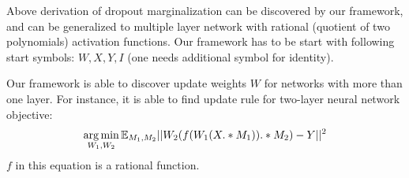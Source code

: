 Above derivation of dropout marginalization can be discovered by our framework, and can be generalized
to multiple layer network with rational (quotient of two polynomials) activation functions. Our framework
has to be start with following start symbols: $W, X, Y, I$ (one needs additional symbol for identity).


Our framework is able to discover update weights $W$ for networks with more than one layer. 
For instance, it is able to find update rule for two-layer neural network objective:
\begin{equation*}
  \operatorname*{arg\,min}_{W_1, W_2} \mathbb{E}_{M_1, M_2} ||W_2(f(W_1(X .* M_1)) .* M_2) - Y||^2
\end{equation*}
$f$ in this equation is a rational function. 





